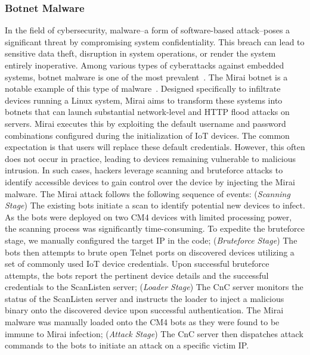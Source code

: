 \documentclass[lettersize,journal]{IEEEtran}
\begin{document}
\subsubsection{Botnet Malware}\label{sec:mirai}
In the field of cybersecurity, malware--a form of software-based attack--poses a significant threat by compromising system confidentiality. This breach can lead to sensitive data theft, disruption in system operations, or render the system entirely inoperative. Among various types of cyberattacks against embedded systems, botnet malware is one of the most prevalent~\cite{mirai}. The Mirai botnet is a notable example of this type of malware~\cite{mirai}. Designed specifically to infiltrate devices running a Linux system, Mirai aims to transform these systems into botnets that can launch substantial network-level and \ac{HTTP} flood attacks on servers. Mirai executes this by exploiting the default username and password combinations configured during the initialization of \ac{IoT} devices. The common expectation is that users will replace these default credentials. However, this often does not occur in practice, leading to devices remaining vulnerable to malicious intrusion. In such cases, hackers leverage scanning and bruteforce attacks to identify accessible devices to gain control over the device by injecting the Mirai malware. The Mirai attack follows the following sequence of events: (\textit{Scanning Stage}) The existing bots initiate a scan to identify potential new devices to infect. As the bots were deployed on two CM4 devices with limited processing power, the scanning process was significantly time-consuming. To expedite the bruteforce stage, we manually configured the target IP in the code; (\textit{Bruteforce Stage}) The bots then attempts to brute open Telnet ports on discovered devices utilizing a set of commonly used IoT device credentials. Upon successful bruteforce attempts, the bots report the pertinent device details and the successful credentials to the ScanListen server; (\textit{Loader Stage}) The \ac{CnC} server monitors the status of the ScanListen server and instructs the loader to inject a malicious binary onto the discovered device upon successful authentication. The Mirai malware was manually loaded onto the CM4 bots as they were found to be immune to Mirai infection; (\textit{Attack Stage}) The \ac{CnC} server then dispatches attack commands to the bots to initiate an attack on a specific victim \ac{IP}. 
\end{document}
